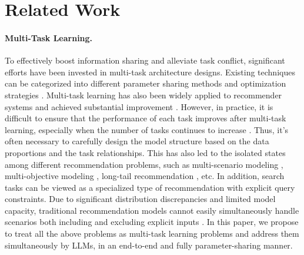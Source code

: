 \section{Related Work}
\paragraph{Multi-Task Learning.}
To effectively boost information sharing and alleviate task conflict, significant efforts have been invested in multi-task architecture designs. Existing techniques can be categorized into different parameter sharing methods \cite{CrossSwitch, UberNet, MTAN, ASTMT,Multi_centernet} and optimization strategies \cite{UW, GradNorm, PCGrad}.
Multi-task learning has also
been widely applied to recommender systems and achieved substantial improvement \cite{MMOE, ESMM, PLE}.
However, in practice, it is difficult to ensure that the performance of each task improves after multi-task learning, especially when the number of tasks continues to increase \cite{taskonomy, forkmerge}. 
Thus, it's often necessary to carefully design the model structure based on the data proportions and the task relationships.
This has also led to the isolated states among different recommendation problems, such as multi-scenario modeling \cite{jiang2022adaptive}, multi-objective modeling \cite{ESMM, cite:multi_objective_recommendation}, long-tail recommendation \cite{cite:longtail_recommendation}, etc. 
In addition, search tasks can be viewed as a specialized type of recommendation with explicit query constraints. 
Due to significant distribution discrepancies and limited model capacity, traditional recommendation models cannot easily simultaneously handle scenarios both including and excluding explicit inputs \cite{liu2024unified}.
In this paper, we propose to treat all the above problems as multi-task learning problems and address them simultaneously by LLMs, in an end-to-end and fully parameter-sharing manner.

\vspace{-10pt}
